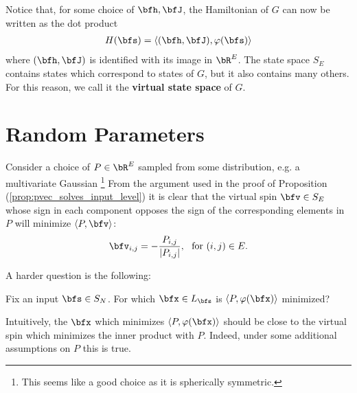 \documentclass[raggedright, nofonts, notitlepage, openany, debug]{tufte-book}
\begin{document}
Notice that, for some choice of $\bfh, \bfJ$, the Hamiltonian of $G$ can now be written as the dot product
\begin{align*}
  H(\bfs) = \langle (\bfh,\bfJ) , \varphi(\bfs)\rangle
\end{align*}
where $(\bfh,\bfJ)$ is identified with its image in $\bR^E$. The state space $S_E$ contains states which correspond to states of $G$, but it also contains many others. For this reason, we call it the \textbf{virtual state space} of $G$.

\section{Random Parameters}
Consider a choice of $P \in \bR^E$ sampled from some distribution, e.g. a multivariate Gaussian \footnote{This seems like a good choice as it is spherically symmetric.} From the argument used in the proof of Proposition (\ref{prop:pvec_solves_input_level}) it is clear that the virtual spin $\bfv \in S_E$ whose sign in each component opposes the sign of the corresponding elements in $P$ will minimize $\langle P,\bfv \rangle$:
\begin{equation}\label{eqn:minimum_virtual_spin}
  \bfv_{i,j} = - \frac{P_{i,j}}{|P_{i,j}|}, ~ \text{ for } (i,j) \in E.
\end{equation}

A harder question is the following:

\begin{question}
  Fix an input $\bfs \in S_N$. For which $\bfx \in L_\bfs$ is $\langle P, \varphi(\bfx) \rangle$ minimized?
\end{question}

Intuitively, the $\bfx$ which minimizes $\langle P, \varphi(\bfx) \rangle$ should be close to the virtual spin which minimizes the inner product with $P$. Indeed, under some additional assumptions on $P$ this is true.
\end{document}
